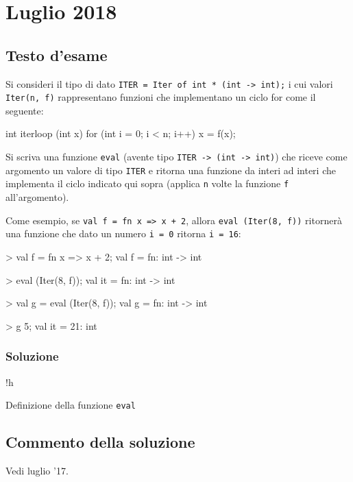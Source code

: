 \section{Luglio 2018}
\subsection{Testo d'esame}

Si consideri il tipo di dato \texttt{ITER = Iter of int * (int -> int);} i cui valori \texttt{Iter(n, f)} rappresentano funzioni che implementano un ciclo for come il seguente:

\begin{cppcode}
int iterloop (int x) {
	for (int i = 0; i < n; i++) {
		x = f(x);
	}
}
\end{cppcode}

Si scriva una funzione \texttt{eval} (avente tipo \texttt{ITER -> (int -> int)}) che riceve come argomento un valore di tipo \texttt{ITER} e ritorna una funzione da interi ad interi che implementa il ciclo indicato qui sopra (applica \texttt{n} volte la funzione \texttt{f} all'argomento).

\medskip
Come esempio, se \texttt{val f = fn x => x + 2}, allora \texttt{eval (Iter(8, f))} ritornerà una funzione che dato un numero \texttt{i = 0} ritorna \texttt{i = 16}:

\begin{smlcode}
> val f = fn x => x + 2;
val f = fn: int -> int

> eval (Iter(8, f));
val it = fn: int -> int

> val g = eval (Iter(8, f));
val g = fn: int -> int

> g 5;
val it = 21: int
\end{smlcode}

\subsubsection{Soluzione}

\begin{listing}{!h}
\caption{Definizione della funzione \texttt{eval}}
\end{listing}

\subsection{Commento della soluzione}

Vedi luglio '17.
